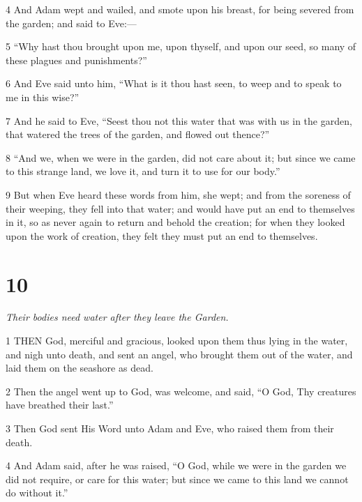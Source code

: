 \par 4 And Adam wept and wailed, and smote upon his breast, for being severed from the garden; and said to Eve:—

\par 5 “Why hast thou brought upon me, upon thyself, and upon our seed, so many of these plagues and punishments?”

\par 6 And Eve said unto him, “What is it thou hast seen, to weep and to speak to me in this wise?”

\par 7 And he said to Eve, “Seest thou not this water that was with us in the garden, that watered the trees of the garden, and flowed out thence?”

\par 8 “And we, when we were in the garden, did not care about it; but since we came to this strange land, we love it, and turn it to use for our body.”

\par 9 But when Eve heard these words from him, she wept; and from the soreness of their weeping, they fell into that water; and would have put an end to themselves in it, so as never again to return and behold the creation; for when they looked upon the work of creation, they felt they must put an end to themselves.

\chapter{10}

\par \textit{Their bodies need water after they leave the Garden.}

\par 1 THEN God, merciful and gracious, looked upon them thus lying in the water, and nigh unto death, and sent an angel, who brought them out of the water, and laid them on the seashore as dead.

\par 2 Then the angel went up to God, was welcome, and said, “O God, Thy creatures have breathed their last.”

\par 3 Then God sent His Word unto Adam and Eve, who raised them from their death.

\par 4 And Adam said, after he was raised, “O God, while we were in the garden we did not require, or care for this water; but since we came to this land we cannot do without it.”

